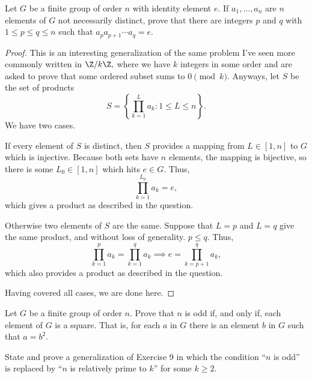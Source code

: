 \begin{exercise}[2]
Let $G$ be a finite group of order $n$ with identity element $e.$ If $a_1,\ldots,a_n$ are $n$ elements of $G$ not necessarily distinct, prove that there are integers $p$ and $q$ with $1\le p\le q\le n$ such that $a_pa_{p+1}\cdots a_q=e.$
\end{exercise}

\begin{proof}
This is an interesting generalization of the same problem I've seen more commonly written in $\Z/k\Z,$ where we have $k$ integers in some order and are asked to prove that some ordered subset sums to $0\pmod k.$ Anyways, let $S$ be the set of products
\[S=\left\{\prod_{k=1}^La_k:1\le L\le n\right\}.\]
We have two cases.

If every element of $S$ is distinct, then $S$ provides a mapping from $L\in[1,n]$ to $G$ which is injective. Because both sets have $n$ elements, the mapping is bijective, so there is some $L_0\in[1,n]$ which hits $e\in G.$ Thus,
\[\prod_{k=1}^{L_0}a_k=e,\]
which gives a product as described in the question.

Otherwise two elements of $S$ are the same. Suppose that $L=p$ and $L=q$ give the same product, and without loss of generality. $p\le q.$ Thus,
\[\prod_{k=1}^pa_k=\prod_{k=1}^qa_k\implies e=\prod_{k=p+1}^qa_k,\]
which also provides a product as described in the question.

Having covered all cases, we are done here.
\end{proof}

\begin{exercise}[9]
Let $G$ be a finite group of order $n.$ Prove that $n$ is odd if, and only if, each element of $G$ is a square. That is, for each $a$ in $G$ there is an element $b$ in $G$ such that $a=b^2.$
\end{exercise}

\begin{exercise}
State and prove a generalization of Exercise 9 in which the condition ``$n$ is odd'' is replaced by ``$n$ is relatively prime to $k$'' for some $k\ge2.$
\end{exercise}

